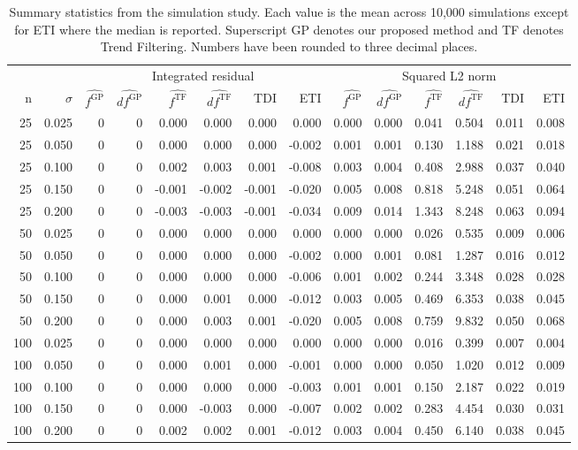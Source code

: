 \documentclass[
  11pt,
]{article}
\theoremstyle{nonumberplain}
\begin{document}
\begin{table}[!h]

\caption{\label{tab:unnamed-chunk-1}\label{tab:simulationSummary}Summary statistics from the simulation study. Each value is the mean across 10,000 simulations except for ETI where the median is reported. Superscript GP denotes our proposed method and TF denotes Trend Filtering. Numbers have been rounded to three decimal places.}
\centering
\fontsize{9}{11}\selectfont
\begin{tabular}[t]{rr|>{}rrrrrr|>{}rrrrrr}
\toprule
\multicolumn{2}{c}{ } & \multicolumn{6}{c}{Integrated residual} & \multicolumn{6}{c}{Squared L2 norm} \\
n & $\sigma$ & $\widehat{f^\text{GP}}$ & $\widehat{df^\text{GP}}$ & $\widehat{f^\text{TF}}$ & $\widehat{df^\text{TF}}$ & TDI & ETI & $\widehat{f^\text{GP}}$ & $\widehat{df^\text{GP}}$ & $\widehat{f^\text{TF}}$ & $\widehat{df^\text{TF}}$ & TDI & ETI\\
\midrule
25 & 0.025 & 0 & 0 & 0.000 & 0.000 & 0.000 & 0.000 & 0.000 & 0.000 & 0.041 & 0.504 & 0.011 & 0.008\\
25 & 0.050 & 0 & 0 & 0.000 & 0.000 & 0.000 & -0.002 & 0.001 & 0.001 & 0.130 & 1.188 & 0.021 & 0.018\\
25 & 0.100 & 0 & 0 & 0.002 & 0.003 & 0.001 & -0.008 & 0.003 & 0.004 & 0.408 & 2.988 & 0.037 & 0.040\\
25 & 0.150 & 0 & 0 & -0.001 & -0.002 & -0.001 & -0.020 & 0.005 & 0.008 & 0.818 & 5.248 & 0.051 & 0.064\\
25 & 0.200 & 0 & 0 & -0.003 & -0.003 & -0.001 & -0.034 & 0.009 & 0.014 & 1.343 & 8.248 & 0.063 & 0.094\\
\hline
50 & 0.025 & 0 & 0 & 0.000 & 0.000 & 0.000 & 0.000 & 0.000 & 0.000 & 0.026 & 0.535 & 0.009 & 0.006\\
50 & 0.050 & 0 & 0 & 0.000 & 0.000 & 0.000 & -0.002 & 0.000 & 0.001 & 0.081 & 1.287 & 0.016 & 0.012\\
50 & 0.100 & 0 & 0 & 0.000 & 0.000 & 0.000 & -0.006 & 0.001 & 0.002 & 0.244 & 3.348 & 0.028 & 0.028\\
50 & 0.150 & 0 & 0 & 0.000 & 0.001 & 0.000 & -0.012 & 0.003 & 0.005 & 0.469 & 6.353 & 0.038 & 0.045\\
50 & 0.200 & 0 & 0 & 0.000 & 0.003 & 0.001 & -0.020 & 0.005 & 0.008 & 0.759 & 9.832 & 0.050 & 0.068\\
\hline
100 & 0.025 & 0 & 0 & 0.000 & 0.000 & 0.000 & 0.000 & 0.000 & 0.000 & 0.016 & 0.399 & 0.007 & 0.004\\
100 & 0.050 & 0 & 0 & 0.000 & 0.001 & 0.000 & -0.001 & 0.000 & 0.000 & 0.050 & 1.020 & 0.012 & 0.009\\
100 & 0.100 & 0 & 0 & 0.000 & 0.000 & 0.000 & -0.003 & 0.001 & 0.001 & 0.150 & 2.187 & 0.022 & 0.019\\
100 & 0.150 & 0 & 0 & 0.000 & -0.003 & 0.000 & -0.007 & 0.002 & 0.002 & 0.283 & 4.454 & 0.030 & 0.031\\
100 & 0.200 & 0 & 0 & 0.002 & 0.002 & 0.001 & -0.012 & 0.003 & 0.004 & 0.450 & 6.140 & 0.038 & 0.045\\
\bottomrule
\end{tabular}
\end{table}
\end{document}
